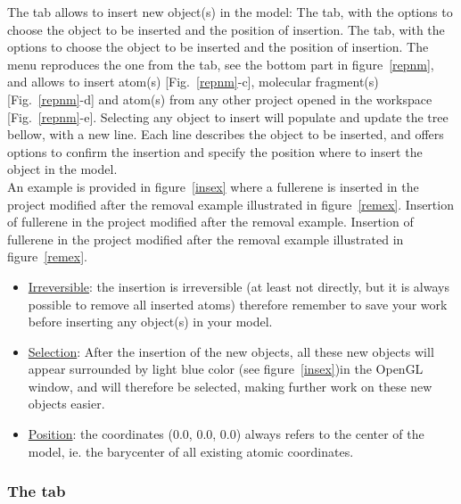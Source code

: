 The  tab allows to insert new object(s) in the model: 
{The  tab, with the options to choose the object to be inserted and the position of insertion.}
{The  tab, with the options to choose the object to be inserted and the position of insertion.}
\laf The  menu reproduces the one from the  tab, see the bottom part in figure~\ref{repnm},
and allows to insert atom(s) [Fig.~\ref{repnm}-c], molecular fragment(s) [Fig.~\ref{repnm}-d] and atom(s) from any other project opened in the workspace [Fig.~\ref{repnm}-e]. 
Selecting any object to insert will populate and update the tree bellow, with a new line. 
Each line describes the object to be inserted, and offers options to confirm the insertion and specify the position where to insert the object in the model. \\
An example is provided in figure~\ref{insex} where a fullerene  is inserted in the  project modified after the removal example illustrated in figure~\ref{remex}.
\newpage
{}
{Insertion of fullerene  in the  project modified after the removal example.}
{Insertion of fullerene  in the  project modified after the removal example illustrated in figure~\ref{remex}.}
\begin{itemize}
\item \uline{Irreversible}: the insertion is irreversible (at least not directly, but it is always possible to remove all inserted atoms)
therefore remember to save your work before inserting any object(s) in your model. 
\item \uline{Selection}: After the insertion of the new objects, 
all these new objects will appear surrounded by light blue color (see figure~\ref{insex})in the OpenGL window, and will therefore be selected, 
making further work on these new objects easier.
\item \uline{Position}: the coordinates (0.0, 0.0, 0.0) always refers to the center of the model, ie. the barycenter of all existing atomic coordinates.
\end{itemize}

\clearpage

\subsubsection*{The  tab}

